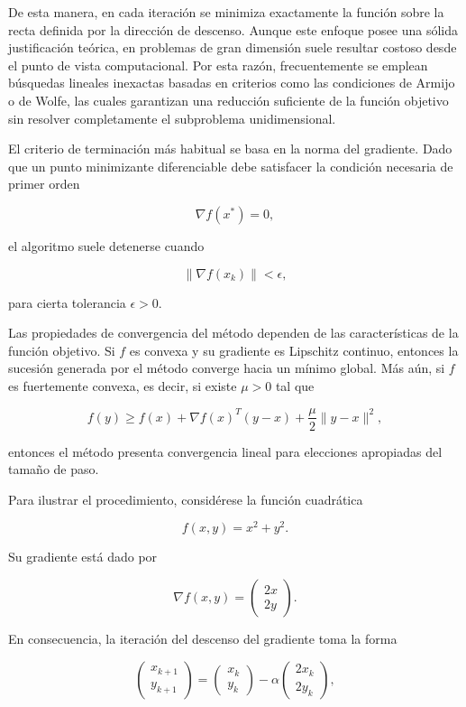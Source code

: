 \documentclass[
  spanish,
  us-letterpaper,
]{scrreprt}
\theoremstyle{definition}
\theoremstyle{remark}
\begin{document}
De esta manera, en cada iteración se minimiza exactamente la función
sobre la recta definida por la dirección de descenso. Aunque este
enfoque posee una sólida justificación teórica, en problemas de gran
dimensión suele resultar costoso desde el punto de vista computacional.
Por esta razón, frecuentemente se emplean búsquedas lineales inexactas
basadas en criterios como las condiciones de Armijo o de Wolfe, las
cuales garantizan una reducción suficiente de la función objetivo sin
resolver completamente el subproblema unidimensional.

El criterio de terminación más habitual se basa en la norma del
gradiente. Dado que un punto minimizante diferenciable debe satisfacer
la condición necesaria de primer orden

\[
\nabla f(x^*) = 0,
\]

el algoritmo suele detenerse cuando

\[
\|\nabla f(x_k)\| < \epsilon,
\]

para cierta tolerancia \(\epsilon > 0\).

Las propiedades de convergencia del método dependen de las
características de la función objetivo. Si \(f\) es convexa y su
gradiente es Lipschitz continuo, entonces la sucesión generada por el
método converge hacia un mínimo global. Más aún, si \(f\) es fuertemente
convexa, es decir, si existe \(\mu > 0\) tal que

\[
f(y) \ge f(x) + \nabla f(x)^T(y-x) + \frac{\mu}{2}\|y-x\|^2,
\]

entonces el método presenta convergencia lineal para elecciones
apropiadas del tamaño de paso.

Para ilustrar el procedimiento, considérese la función cuadrática

\[
f(x,y) = x^2 + y^2.
\]

Su gradiente está dado por

\[
\nabla f(x,y) =
\begin{pmatrix}
2x \\
2y
\end{pmatrix}.
\]

En consecuencia, la iteración del descenso del gradiente toma la forma

\[
\begin{pmatrix}
x_{k+1} \\
y_{k+1}
\end{pmatrix}
=
\begin{pmatrix}
x_k \\
y_k
\end{pmatrix}
-
\alpha
\begin{pmatrix}
2x_k \\
2y_k
\end{pmatrix},
\]
\end{document}

